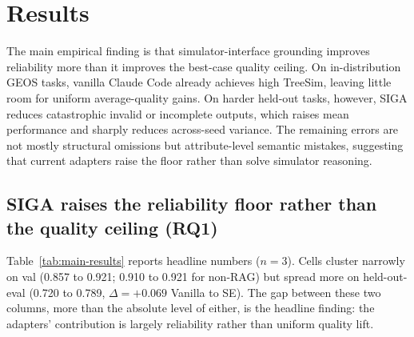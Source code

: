 \documentclass{article}
\begin{document}
\section{Results}
\label{sec:results}

The main empirical finding is that simulator-interface grounding improves reliability more than it improves the 
best-case quality ceiling. On in-distribution GEOS tasks, vanilla Claude Code already achieves high TreeSim, leaving 
little room for uniform average-quality gains. On harder held-out tasks, however, SIGA reduces catastrophic invalid or 
incomplete outputs, which raises mean performance and sharply reduces across-seed variance. The remaining errors are 
not mostly structural omissions but attribute-level semantic mistakes, suggesting that current adapters raise the floor 
rather than solve simulator reasoning.

\subsection{SIGA raises the reliability floor rather than the quality ceiling (RQ1)}
\label{subsec:quality}

Table~\ref{tab:main-results} reports headline numbers ($n=3$). Cells cluster narrowly on val (0.857 to 0.921; 0.910 to 0.921 for non-RAG) but spread more on held-out-eval (0.720 to 0.789, $\Delta = +0.069$ Vanilla to SE). The gap between these two columns, more than the absolute level of either, is the headline finding: the adapters' contribution is largely reliability rather than uniform quality lift.
\end{document}
